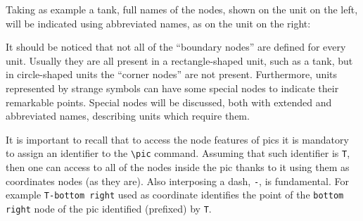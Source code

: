 \documentclass[12pt]{article}						%
\newcommand*{\chpn}[1]{\texttt{#1}}				%
\begin{document}
Taking as example a tank, full names of the nodes, shown on the unit on the left,
will be indicated using abbreviated names, as on the unit on the right:
\begin{center}
\end{center}

It should be noticed that not all of the ``boundary nodes'' are defined for
every unit. Usually they are all present in a rectangle-shaped unit, such as a
tank, but in circle-shaped units the ``corner nodes'' are not present.
Furthermore, units represented by strange symbols can have some special nodes to
indicate their remarkable points. Special nodes will be discussed, both with
extended and abbreviated names, describing units which require them.

It is important to recall that to access the node features of pics it is
mandatory to assign an identifier to the \verb|\pic| command. Assuming that
such identifier is \chpn{T}, then one can access to all of the nodes inside the
pic thanks to it using them as coordinates nodes (as they are). Also interposing
a dash, \verb|-|, is fundamental. For example \chpn{T-bottom right} used as
coordinate identifies the point of the \chpn{bottom right} node of the pic
identified (prefixed) by \chpn{T}.
\end{document}
